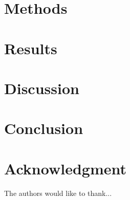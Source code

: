 \documentclass[10pt,twocolumn]{article}
\begin{document}


\section{Methods}
\label{sec:methods}




\section{Results}
\label{sec:results}



\section{Discussion}
\label{sec:discussion}





\section{Conclusion}

\label{sec:conclusion}




\section*{Acknowledgment}


The authors would like to thank...


\printbibliography 
\end{document}
